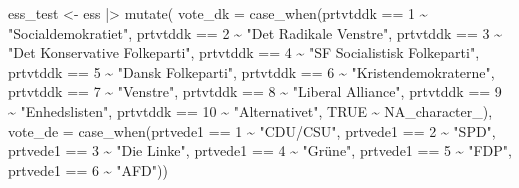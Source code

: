 \documentclass[
  letterpaper,
  DIV=11,
  numbers=noendperiod]{scrreprt}
\newenvironment{Shaded}{\begin{snugshade}}{\end{snugshade}}
\newcommand{\AttributeTok}[1]{\textcolor[rgb]{0.40,0.45,0.13}{#1}}
\newcommand{\ConstantTok}[1]{\textcolor[rgb]{0.56,0.35,0.01}{#1}}
\newcommand{\DecValTok}[1]{\textcolor[rgb]{0.68,0.00,0.00}{#1}}
\newcommand{\FunctionTok}[1]{\textcolor[rgb]{0.28,0.35,0.67}{#1}}
\newcommand{\NormalTok}[1]{\textcolor[rgb]{0.00,0.23,0.31}{#1}}
\newcommand{\OtherTok}[1]{\textcolor[rgb]{0.00,0.23,0.31}{#1}}
\newcommand{\SpecialCharTok}[1]{\textcolor[rgb]{0.37,0.37,0.37}{#1}}
\newcommand{\StringTok}[1]{\textcolor[rgb]{0.13,0.47,0.30}{#1}}
\begin{document}
\begin{Shaded}
\begin{Highlighting}[]
\NormalTok{ess\_test }\OtherTok{\textless{}{-}}\NormalTok{ ess }\SpecialCharTok{|\textgreater{}} 
  \FunctionTok{mutate}\NormalTok{(}
    \AttributeTok{vote\_dk =} \FunctionTok{case\_when}\NormalTok{(prtvtddk }\SpecialCharTok{==} \DecValTok{1} \SpecialCharTok{\textasciitilde{}} \StringTok{"Socialdemokratiet"}\NormalTok{,}
\NormalTok{                        prtvtddk }\SpecialCharTok{==} \DecValTok{2} \SpecialCharTok{\textasciitilde{}} \StringTok{"Det Radikale Venstre"}\NormalTok{,}
\NormalTok{                        prtvtddk }\SpecialCharTok{==} \DecValTok{3} \SpecialCharTok{\textasciitilde{}} \StringTok{"Det Konservative Folkeparti"}\NormalTok{,}
\NormalTok{                        prtvtddk }\SpecialCharTok{==} \DecValTok{4} \SpecialCharTok{\textasciitilde{}} \StringTok{"SF Socialistisk Folkeparti"}\NormalTok{,}
\NormalTok{                        prtvtddk }\SpecialCharTok{==} \DecValTok{5} \SpecialCharTok{\textasciitilde{}} \StringTok{"Dansk Folkeparti"}\NormalTok{,}
\NormalTok{                        prtvtddk }\SpecialCharTok{==} \DecValTok{6} \SpecialCharTok{\textasciitilde{}} \StringTok{"Kristendemokraterne"}\NormalTok{,}
\NormalTok{                        prtvtddk }\SpecialCharTok{==} \DecValTok{7} \SpecialCharTok{\textasciitilde{}} \StringTok{"Venstre"}\NormalTok{,}
\NormalTok{                        prtvtddk }\SpecialCharTok{==} \DecValTok{8} \SpecialCharTok{\textasciitilde{}} \StringTok{"Liberal Alliance"}\NormalTok{,}
\NormalTok{                        prtvtddk }\SpecialCharTok{==} \DecValTok{9} \SpecialCharTok{\textasciitilde{}} \StringTok{"Enhedslisten"}\NormalTok{,}
\NormalTok{                        prtvtddk }\SpecialCharTok{==} \DecValTok{10} \SpecialCharTok{\textasciitilde{}} \StringTok{"Alternativet"}\NormalTok{,}
                        \ConstantTok{TRUE} \SpecialCharTok{\textasciitilde{}} \ConstantTok{NA\_character\_}\NormalTok{),}
    \AttributeTok{vote\_de =} \FunctionTok{case\_when}\NormalTok{(prtvede1 }\SpecialCharTok{==} \DecValTok{1} \SpecialCharTok{\textasciitilde{}} \StringTok{"CDU/CSU"}\NormalTok{,}
\NormalTok{                        prtvede1 }\SpecialCharTok{==} \DecValTok{2} \SpecialCharTok{\textasciitilde{}} \StringTok{"SPD"}\NormalTok{,}
\NormalTok{                        prtvede1 }\SpecialCharTok{==} \DecValTok{3} \SpecialCharTok{\textasciitilde{}} \StringTok{"Die Linke"}\NormalTok{,}
\NormalTok{                        prtvede1 }\SpecialCharTok{==} \DecValTok{4} \SpecialCharTok{\textasciitilde{}} \StringTok{"Grüne"}\NormalTok{,}
\NormalTok{                        prtvede1 }\SpecialCharTok{==} \DecValTok{5} \SpecialCharTok{\textasciitilde{}} \StringTok{"FDP"}\NormalTok{,}
\NormalTok{                        prtvede1 }\SpecialCharTok{==} \DecValTok{6} \SpecialCharTok{\textasciitilde{}} \StringTok{"AFD"}\NormalTok{))}
\end{Highlighting}
\end{Shaded}
\end{document}
